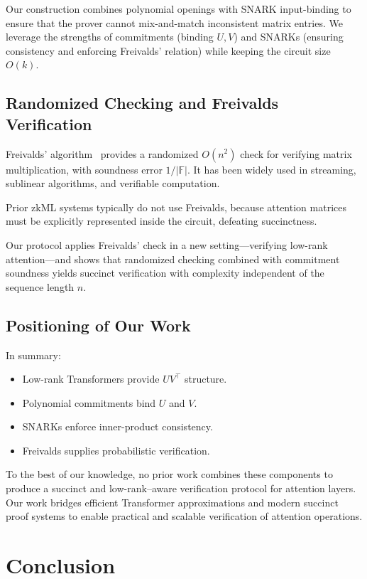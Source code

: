 \documentclass[11pt]{article}
\begin{document}
Our construction combines polynomial openings with SNARK input-binding
to ensure that the prover cannot mix-and-match inconsistent matrix
entries.  
We leverage the strengths of commitments (binding $U,V$) and SNARKs
(ensuring consistency and enforcing Freivalds’ relation) while keeping
the circuit size $O(k)$.

\subsection{Randomized Checking and Freivalds Verification}

Freivalds’ algorithm~\cite{freivalds1979} provides a randomized
$O(n^2)$ check for verifying matrix multiplication, with soundness error
$1/|\mathbb{F}|$.  
It has been widely used in streaming, sublinear algorithms, and
verifiable computation.

Prior zkML systems typically do not use Freivalds, because attention
matrices must be explicitly represented inside the circuit, defeating
succinctness.

Our protocol applies Freivalds’ check in a new setting—verifying
low-rank attention—and shows that randomized checking combined with
commitment soundness yields succinct verification with complexity
independent of the sequence length $n$.

\subsection{Positioning of Our Work}

In summary:

\begin{itemize}
  \item Low-rank Transformers provide $UV^\top$ structure.
  \item Polynomial commitments bind $U$ and $V$.
  \item SNARKs enforce inner-product consistency.
  \item Freivalds supplies probabilistic verification.
\end{itemize}

To the best of our knowledge, no prior work combines these components to
produce a succinct and low-rank–aware verification protocol for
attention layers.
Our work bridges efficient Transformer approximations and modern
succinct proof systems to enable practical and scalable verification of
attention operations.

\section{Conclusion}
\end{document}
